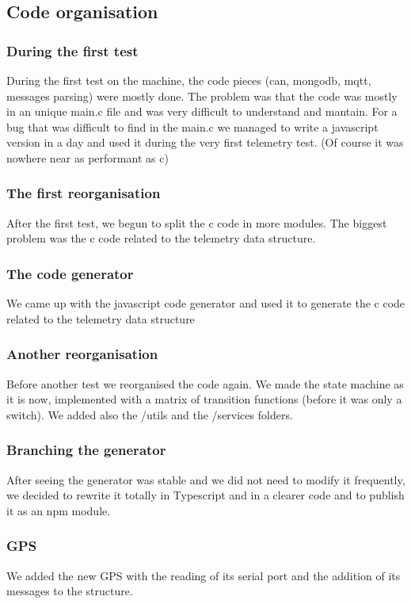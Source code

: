 \subsection{Code organisation}

\subsubsection{During the first test}
During the first test on the machine, the code pieces (can, mongodb, mqtt, messages parsing) were mostly done. The problem was that the code
was mostly in an unique main.c file and was very difficult to understand and mantain. For a bug that was difficult to find in the main.c
we managed to write a javascript version in a day and used it during the very first telemetry test. (Of course it was nowhere near as performant as c)

\subsubsection{The first reorganisation}
After the first test, we begun to split the c code in more modules. The biggest problem was the c code related to the telemetry data structure.

\subsubsection{The code generator}
We came up with the javascript code generator and used it to generate the c code related to the telemetry data structure

\subsubsection{Another reorganisation}
Before another test we reorganised the code again. We made the state machine as it is now, implemented with a matrix of transition functions (before it was only a switch).
We added also the /utils and the /services folders. 

\subsubsection{Branching the generator}
After seeing the generator was stable and we did not need to modify it frequently, we decided to rewrite it totally in Typescript and in a clearer
code and to publish it as an npm module.

\subsubsection{GPS}
We added the new GPS with the reading of its serial port and the addition of its messages to the structure.

